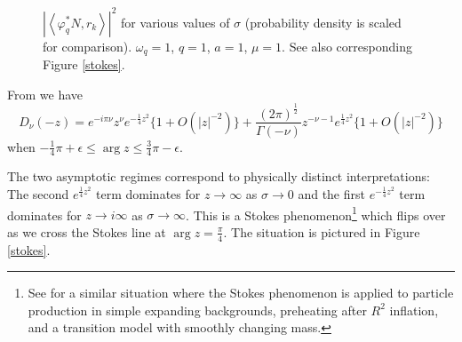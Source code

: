 \documentclass[12pt,a4paper]{article}
\begin{document}
{\begin{figure}
\caption{$\left|\left< \varphi^*_q N, r_k \right>\right|^2$ for various values of $\sigma$ (probability density is scaled for comparison). $\omega_q = 1$, $q = 1$, $a=1$, $\mu = 1$. See also corresponding Figure \ref{stokes}.}
\label{pcf_sigma_curves}
\end{figure}
From \cite{Olver1959UniformAE} we have
\begin{equation}
  D_\nu(-z) = e^{-i\pi\nu}z^{\nu}e^{-\frac{1}{4}z^2} \{ 1 + O(|z|^{-2}) \} + \frac{(2 \pi)^{\frac{1}{2}}}{\Gamma(-\nu)} z^{-\nu - 1} e^{\frac{1}{4}z^2} \{1 + O(|z|^{-2})\}
\label{asym}
\end{equation}
when $-\frac{1}{4}\pi + \epsilon \le \arg z \le \frac{3}{4} \pi - \epsilon$.

The two asymptotic regimes correspond to physically distinct interpretations: The second $e^{\frac{1}{4}z^2}$ term dominates for $z \to \infty$ as $\sigma \to 0$ and the first  $e^{-\frac{1}{4}z^2}$ term dominates for $z \to i \infty$ as $\sigma \to \infty$.  This is a Stokes phenomenon\footnote{See \cite{hashiba2021stokes} for a similar situation where the Stokes phenomenon is applied to particle production in simple expanding backgrounds, preheating after $R^2$ inflation, and a transition model with smoothly changing mass.} which flips over as we cross the Stokes line at $\arg z = \frac{\pi}{4}$. The situation is pictured in Figure \ref{stokes}.


}
\end{document}
